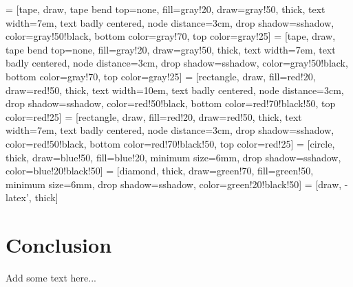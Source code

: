 

 = [tape, draw, tape bend top=none, fill=gray!20, draw=gray!50, thick, 
    text width=7em, text badly centered, node distance=3cm, drop shadow={sshadow, color=gray!50!black},
    bottom color=gray!70, top color=gray!25]
 = [tape, draw, tape bend top=none, fill=gray!20, draw=gray!50, thick,
    text width=7em, text badly centered, node distance=3cm, drop shadow={sshadow, color=gray!50!black},
    bottom color=gray!70, top color=gray!25]
 = [rectangle, draw, fill=red!20, draw=red!50, thick,
    text width=10em, text badly centered, node distance=3cm, drop shadow={sshadow, color=red!50!black},
    bottom color=red!70!black!50, top color=red!25]
 = [rectangle, draw, fill=red!20, draw=red!50, thick,
    text width=7em, text badly centered, node distance=3cm, drop shadow={sshadow, color=red!50!black},
    bottom color=red!70!black!50, top color=red!25]
 = [circle, thick, draw=blue!50, fill=blue!20, minimum size=6mm,
    drop shadow={sshadow, color=blue!20!black!50}]
 = [diamond, thick, draw=green!70, fill=green!50, minimum size=6mm,
    drop shadow={sshadow, color=green!20!black!50}]
 = [draw, -latex', thick]

\chapter{Conclusion}
\label{sec:conclusion}
Add some text here...
